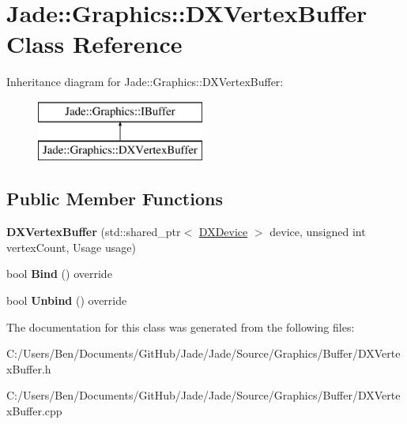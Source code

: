 \hypertarget{class_jade_1_1_graphics_1_1_d_x_vertex_buffer}{}\section{Jade\+:\+:Graphics\+:\+:D\+X\+Vertex\+Buffer Class Reference}
\label{class_jade_1_1_graphics_1_1_d_x_vertex_buffer}
Inheritance diagram for Jade\+:\+:Graphics\+:\+:D\+X\+Vertex\+Buffer\+:\begin{figure}[H]
\begin{center}
\leavevmode
\includegraphics[height=2.000000cm]{class_jade_1_1_graphics_1_1_d_x_vertex_buffer}
\end{center}
\end{figure}
\subsection*{Public Member Functions}
\begin{DoxyCompactItemize}
\item 
\hypertarget{class_jade_1_1_graphics_1_1_d_x_vertex_buffer_a964ae76c9c3b7dcf0edca8605d48aa07}{}{\bfseries D\+X\+Vertex\+Buffer} (std\+::shared\+\_\+ptr$<$ \hyperlink{class_jade_1_1_graphics_1_1_d_x_device}{D\+X\+Device} $>$ device, unsigned int vertex\+Count, Usage usage)\label{class_jade_1_1_graphics_1_1_d_x_vertex_buffer_a964ae76c9c3b7dcf0edca8605d48aa07}

\item 
\hypertarget{class_jade_1_1_graphics_1_1_d_x_vertex_buffer_a8bf9ff2087fc6c082ce93ba0d4cf9d54}{}bool {\bfseries Bind} () override\label{class_jade_1_1_graphics_1_1_d_x_vertex_buffer_a8bf9ff2087fc6c082ce93ba0d4cf9d54}

\item 
\hypertarget{class_jade_1_1_graphics_1_1_d_x_vertex_buffer_a9a35d39bdc9a7ad88890f1939317511b}{}bool {\bfseries Unbind} () override\label{class_jade_1_1_graphics_1_1_d_x_vertex_buffer_a9a35d39bdc9a7ad88890f1939317511b}

\end{DoxyCompactItemize}


The documentation for this class was generated from the following files\+:\begin{DoxyCompactItemize}
\item 
C\+:/\+Users/\+Ben/\+Documents/\+Git\+Hub/\+Jade/\+Jade/\+Source/\+Graphics/\+Buffer/D\+X\+Vertex\+Buffer.\+h\item 
C\+:/\+Users/\+Ben/\+Documents/\+Git\+Hub/\+Jade/\+Jade/\+Source/\+Graphics/\+Buffer/D\+X\+Vertex\+Buffer.\+cpp\end{DoxyCompactItemize}
